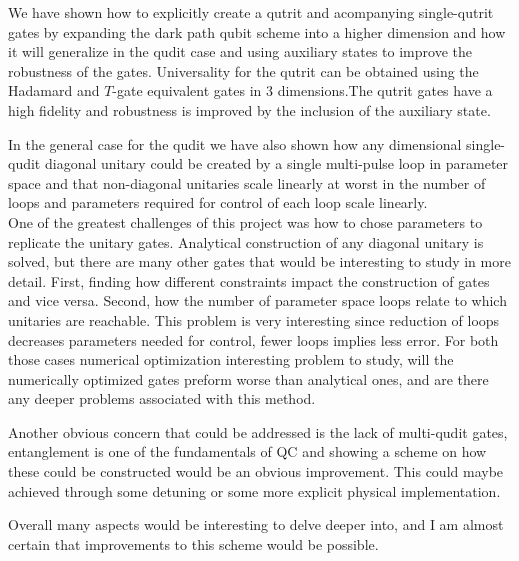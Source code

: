 We have shown how to explicitly create a qutrit and acompanying single-qutrit gates by expanding the dark path qubit scheme\cite{darkpath} into a higher dimension and how it will generalize in the qudit case and using auxiliary states to improve the robustness of the gates. Universality for the qutrit can be obtained using the Hadamard and $T$-gate equivalent gates in 3 dimensions.The qutrit gates have a high fidelity and robustness is improved by the inclusion of the auxiliary state. 

In the general case for the qudit we have also shown how any dimensional single-qudit diagonal unitary could be created by a single multi-pulse loop in parameter space and that non-diagonal unitaries scale linearly at worst in the number of loops and parameters required for control of each loop scale linearly.
\\

One of the greatest challenges of this project was how to chose parameters to replicate the unitary gates. Analytical construction of any diagonal unitary is solved, but there are many other gates that would be interesting to study in more detail. First, finding how different constraints impact the construction of gates and vice versa. Second, how the number of parameter space loops relate to which unitaries are reachable. This problem is very interesting since reduction of loops decreases parameters needed for control, fewer loops implies less error.
For both those cases numerical optimization interesting problem to study, will the numerically optimized gates preform worse than analytical ones, and are there any deeper problems associated with this method.
 
Another obvious concern that could be addressed is the lack of multi-qudit gates, entanglement is one of the fundamentals of QC and showing a scheme on how these could be constructed would be an obvious improvement. This could maybe achieved through some detuning or some more explicit physical implementation.

Overall many aspects would be interesting to delve deeper into, and I am almost certain that improvements to this scheme would be possible.
